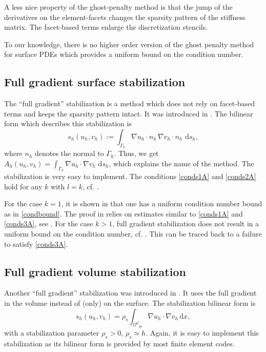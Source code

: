\documentclass[final]{siamltex}
\begin{document}
A less nice property of the ghost-penalty method is that the jump of the derivatives on the element-facets changes the sparsity pattern of the stiffness matrix. The facet-based terms enlarge the discretization stencils. 

To our knowledge, there is no higher order version of the ghost penalty method for surface PDEs which provides a uniform bound on the condition number.

\subsection{Full gradient surface stabilization} \label{sec:fullgradsurf}
The ``full gradient'' stabilization is a method which does not rely on facet-based terms and keeps the sparsity pattern intact. It was introduced in \cite{DER14,reusken2015}. The bilinear form which describes this stabilization is
\begin{equation} \label{fullgradient}
 s_h(u_h,v_h):= \int_{\Gamma_h} \nabla u_h \cdot n_h \, \nabla v_h \cdot n_h \, {\,\mathrm{d} {s_h}},
\end{equation}
where $n_h$ denotes the normal to $\Gamma_h$.
Thus, we get $A_h(u_h,v_h)=\int_{\Gamma_h} \nabla u_h \cdot \nabla v_h \, {\,\mathrm{d} {s_h}}$, which explains the name of the method. 
The stabilization is very easy to implement. The conditions \eqref{conds1A} and \eqref{conds2A} hold for any $k$ with $l=k$, cf. \cite[Lemma 5.5]{reusken2015}.

For the case $k=1$, it is shown in \cite{reusken2015} that one has a uniform condition number bound as in \eqref{condbound}. The proof in \cite{reusken2015} relies on estimates similar to \eqref{conds1A} and \eqref{conds3A}, see \cite[Lemma 6.3]{reusken2015}.
For the case $k >1$, full gradient stabilization does not result in a uniform bound on the condition number, cf. \cite[Remark 6.5]{reusken2015}. This can be traced back to a failure to satisfy \eqref{conds3A}.

\subsection{Full gradient volume stabilization} \label{sec:fullgradvol}
Another ``full gradient'' stabilization was introduced in \cite{burman16fullgradcmame}. It uses the full gradient in the volume instead of (only) on the surface. The stabilization bilinear form is
\[
 s_h(u_h,v_h) = \rho_s \int_{{\Omega^{\Gamma}}_{\Theta}} \nabla u_h \cdot \nabla v_h {\,\mathrm{d} {x}},
\]
with a stabilization parameter $\rho_s > 0$, $\rho_s \simeq h$. Again, it is easy to implement this stabilization as its bilinear form is provided by most finite element codes.
\end{document}
